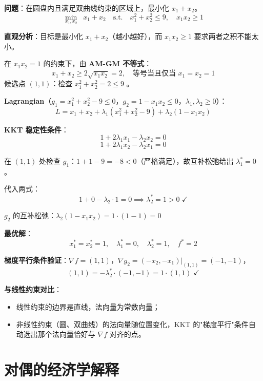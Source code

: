 \documentclass[12pt, a4paper]{ctexart}
\begin{document}
\begin{blackboard}

\textbf{问题}：在圆盘内且满足双曲线约束的区域上，最小化 $x_1+x_2$。
\[
\min_{x_1,x_2} \;\; x_1 + x_2 \quad \text{s.t.} \quad x_1^2 + x_2^2 \leq 9, \quad x_1 x_2 \geq 1
\]

\textbf{直观分析}：目标是最小化 $x_1+x_2$（越小越好），而 $x_1 x_2 \geq 1$ 要求两者之积不能太小。

在 $x_1 x_2 = 1$ 的约束下，由 \textbf{AM-GM 不等式}：
\[
x_1 + x_2 \geq 2\sqrt{x_1 x_2} = 2, \quad \text{等号当且仅当 } x_1 = x_2 = 1
\]
候选点 $(1,1)$：检查 $x_1^2+x_2^2 = 2 \leq 9$ \checkmark。

\textbf{Lagrangian}（$g_1 = x_1^2+x_2^2-9 \leq 0$，$g_2 = 1-x_1x_2 \leq 0$，$\lambda_1,\lambda_2 \geq 0$）：
\[
L = x_1 + x_2 + \lambda_1(x_1^2+x_2^2-9) + \lambda_2(1 - x_1 x_2)
\]

\textbf{KKT 稳定性条件}：
\[
1 + 2\lambda_1 x_1 - \lambda_2 x_2 = 0
\]
\[
1 + 2\lambda_1 x_2 - \lambda_2 x_1 = 0
\]

在 $(1,1)$ 处检查 $g_1$：$1+1-9=-8 < 0$（严格满足），故互补松弛给出 $\lambda_1^* = 0$。

代入两式：
\[
1 + 0 - \lambda_2 \cdot 1 = 0 \implies \lambda_2^* = 1 > 0 \;\checkmark
\]

$g_2$ 的互补松弛：$\lambda_2(1-x_1 x_2)=1\cdot(1-1)=0$ \checkmark

\textbf{最优解}：
\[
x_1^* = x_2^* = 1, \quad \lambda_1^* = 0, \quad \lambda_2^* = 1, \quad f^* = 2
\]

\textbf{梯度平行条件验证}：$\nabla f = (1,1)$，$\nabla g_2 = (-x_2,-x_1)|_{(1,1)} = (-1,-1)$，
\[
(1,1) = -\lambda_2^* \cdot (-1,-1) = 1 \cdot (1,1) \;\checkmark
\]

\textbf{与线性约束对比}：
\begin{itemize}
  \item 线性约束的边界是直线，法向量为常数向量；
  \item 非线性约束（圆、双曲线）的法向量随位置变化，KKT 的"梯度平行"条件自动选出那个法向量恰好与 $\nabla f$ 对齐的点。
\end{itemize}

\end{blackboard}

\section{对偶的经济学解释}
\end{document}
